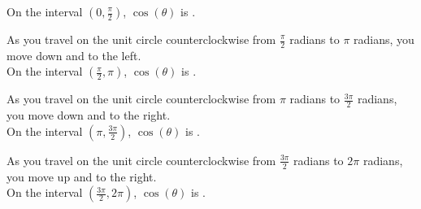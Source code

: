 \documentclass{ximera}
\begin{document}
\begin{example}
\begin{question}
On the interval $\left (0, \frac{\pi}{2} \right)$, $\cos(\theta)$ is . \\

\end{question}







\begin{question}


As you travel on the unit circle counterclockwise from $\frac{\pi}{2}$ radians to $\pi$ radians, you move down and to the left. \\


On the interval $\left (\frac{\pi}{2}, \pi \right)$, $\cos(\theta)$ is . \\

\end{question}







\begin{question}


As you travel on the unit circle counterclockwise from $\pi$ radians to $\frac{3\pi}{2}$ radians, you move down and to the right. \\


On the interval $\left (\pi, \frac{3\pi}{2} \right)$, $\cos(\theta)$ is . \\

\end{question}








\begin{question}


As you travel on the unit circle counterclockwise from $\frac{3\pi}{2}$ radians to $2\pi$ radians, you move up and to the right. \\


On the interval $\left (\frac{3\pi}{2}, 2\pi \right)$, $\cos(\theta)$ is . \\

\end{question}




















\end{example}
\end{document}
